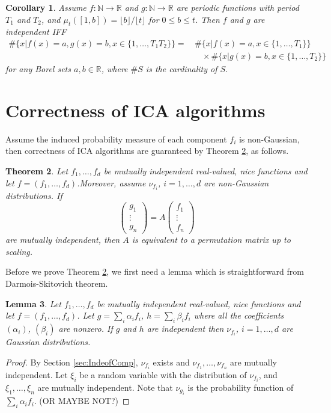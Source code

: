 \documentclass[english]{article} %
\newcommand{\real}{\mathbb{R}}
\renewcommand{\natural}{\mathbb{N}}
\providecommand{\lemmaname}{Lemma}
\providecommand{\theoremname}{Theorem}
\providecommand{\corollaryname}{Corollary}
\theoremstyle{plain}
\newtheorem{thm}{\protect\theoremname}
\newtheorem{lemma}[thm]{\protect\lemmaname}
\newtheorem{cor}[thm]{\protect\corollaryname}
\theoremstyle{definition}
\theoremstyle{remark}
\begin{document}
\begin{cor}
Assume $f:\natural \rightarrow\real$ and $g:\natural \rightarrow\real$ are periodic functions with period $T_1$ and $T_2$, 
and $\mu_t([1,b]) = \lfloor b\rfloor/\lfloor t\rfloor$ for $0\le b\le t$.  
Then $f$ and $g$ are independent IFF 
\begin{align*}
\#\big\{x\vert f(x) = a, g(x) = b, x\in \{1,\ldots,T_1T_2\} \big\} = & \, \#\big\{x\vert f(x) = a, x\in \{1,\ldots,T_1\} \big\} \\
& \quad \times \#\big\{x\vert g(x) = b, x\in \{1,\ldots,T_2\} \big\} 
\end{align*}
for any Borel sets $a,b\in \real$, where $\#S$ is the cardinality of $S$.
\end{cor}


\section{Correctness of ICA algorithms}
Assume the induced probability measure of each component $f_i$ is non-Gaussian, then correctness of ICA algorithms are guaranteed by Theorem \ref{thm:CorofICA}, as follows.
\begin{thm}
\label{thm:CorofICA}
Let $f_1,\ldots,f_d$ be mutually independent real-valued, nice functions and let $f = (f_1,\ldots,f_d)$.Moreover, assume $\nu_{f_i}$, $i=1,\ldots,d$ are non-Gaussian distributions. If
\begin{equation}
\left(
\begin{array}{ccc}
g_1 \\
\vdots \\
g_n
\end{array}
\right) = A
\left(
\begin{array}{ccc}
f_1 \\
\vdots \\
f_n
\end{array}
\right)
\end{equation}
are mutually independent, then $A$ is equivalent to a permutation matrix up to scaling.
\end{thm}

Before we prove Theorem \ref{thm:CorofICA}, we first need a lemma which is straightforward from Darmois-Skitovich theorem.
\begin{lemma}
Let $f_1,\ldots,f_d$ be mutually independent real-valued, nice functions and let $f = (f_1,\ldots,f_d)$.
Let $g = \sum_i \alpha_i f_i$, $h = \sum_i \beta_i f_i$ where all the coefficients $(\alpha_i)$, $(\beta_i)$ are nonzero.
If $g$ and $h$ are independent then $\nu_{f_i}$, $i=1,\ldots,d$ are Gaussian distributions.
\end{lemma}
\begin{proof}
By Section \ref{sec:IndeofComp}, $\nu_{f_i}$ exists and $\nu_{f_1},\ldots,\nu_{f_n}$ are mutually independent. 
Let $\xi_i$ be a random variable with the distribution of $\nu_{f_i}$, and  $\xi_1,\ldots,\xi_n$ are mutually independent. Note that $\nu_{g_i}$ is the probability function of $\sum_{i}\alpha_if_i$. (OR MAYBE NOT?) 
\end{proof}
\end{document}
